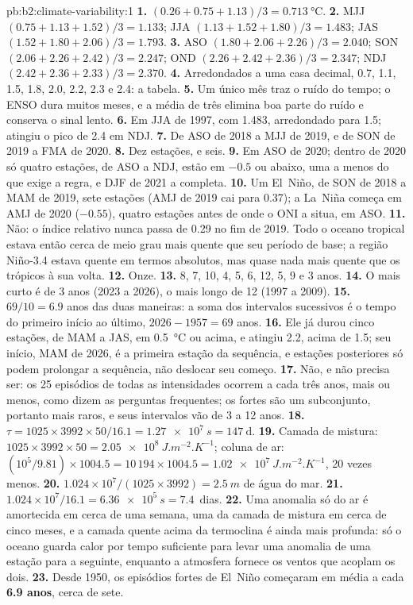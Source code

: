 \begin{solution}{pb:b2:climate-variability:1}
\textbf{1.} $(0.26 + 0.75 + 1.13)/3 = \qty{0.713}{\celsius}$.
\textbf{2.} MJJ $(0.75 + 1.13 + 1.52)/3 = 1.133$; JJA $(1.13 + 1.52 + 1.80)/3 = 1.483$; JAS $(1.52 +
1.80 + 2.06)/3 = 1.793$.
\textbf{3.} ASO $(1.80 + 2.06 + 2.26)/3 = 2.040$; SON $(2.06 + 2.26 + 2.42)/3 = 2.247$; OND $(2.26
+ 2.42 + 2.36)/3 = 2.347$; NDJ $(2.42 + 2.36 + 2.33)/3 = 2.370$.
\textbf{4.} Arredondados a uma casa decimal, 0.7, 1.1, 1.5, 1.8, 2.0, 2.2, 2.3 e 2.4: a tabela.
\textbf{5.} Um único mês traz o ruído do tempo; o ENSO dura muitos meses, e a média de três
elimina boa parte do ruído e conserva o sinal lento.
\textbf{6.} Em JJA de 1997, com 1.483, arredondado para 1.5; atingiu o pico de 2.4 em NDJ.
\textbf{7.} De ASO de 2018 a MJJ de 2019, e de SON de 2019 a FMA de 2020.
\textbf{8.} Dez estações, e seis.
\textbf{9.} Em ASO de 2020; dentro de 2020 só quatro estações, de ASO a NDJ, estão em $-0.5$ ou abaixo, uma
a menos do que exige a regra, e DJF de 2021 a completa.
\textbf{10.} Um El~Niño, de SON de 2018 a MAM de 2019, sete estações (AMJ de 2019 cai para 0.37); a
La~Niña começa em AMJ de 2020 ($-0.55$), quatro estações antes de onde o ONI a situa, em ASO.
\textbf{11.} Não: o índice relativo nunca passa de 0.29 no fim de 2019. Todo o oceano tropical estava
então cerca de meio grau mais quente que seu período de base; a região Niño-3.4 estava quente em
termos absolutos, mas quase nada mais quente que os trópicos à sua volta.
\textbf{12.} Onze.
\textbf{13.} 8, 7, 10, 4, 5, 6, 12, 5, 9 e 3 anos.
\textbf{14.} O mais curto é de 3 anos (2023 a 2026), o mais longo de 12 (1997 a 2009).
\textbf{15.} $69/10 = 6.9$ anos das duas maneiras: a soma dos intervalos sucessivos é o tempo do
primeiro início ao último, $2026 - 1957 = 69$ anos.
\textbf{16.} Ele já durou cinco estações, de MAM a JAS, em \qty{0.5}{\celsius} ou acima, e
atingiu 2.2, acima de 1.5; seu início, MAM de 2026, é a primeira estação da sequência, e estações posteriores
só podem prolongar a sequência, não deslocar seu começo.
\textbf{17.} Não, e não precisa ser: os 25 episódios de todas as intensidades ocorrem a cada três anos, mais ou menos, como dizem as perguntas frequentes;
os fortes são um subconjunto, portanto mais raros, e seus intervalos vão de 3 a 12 anos.
\textbf{18.} $\tau = 1025 \times 3992 \times 50/16.1 = \qty{1.27e7}{s} = \qty{147}{\day}$.
\textbf{19.} Camada de mistura: $1025 \times 3992 \times 50 = \qty{2.05e8}{J.m^{-2}.K^{-1}}$; coluna de ar:
$(10^5/9.81) \times 1004.5 = 10\,194 \times 1004.5 = \qty{1.02e7}{J.m^{-2}.K^{-1}}$, 20 vezes
menos.
\textbf{20.} $1.024 \times 10^7/(1025 \times 3992) = \qty{2.5}{m}$ de água do mar.
\textbf{21.} $1.024 \times 10^7/16.1 = \qty{6.36e5}{s} = 7.4$~dias.
\textbf{22.} Uma anomalia só do ar é amortecida em cerca de uma semana, uma da camada de mistura em
cerca de cinco meses, e a camada quente acima da termoclina é ainda mais profunda: só o oceano guarda
calor por tempo suficiente para levar uma anomalia de uma estação para a seguinte, enquanto a atmosfera fornece
os ventos que acoplam os dois.
\textbf{23.} Desde 1950, os episódios fortes de El~Niño começaram em média a cada \textbf{6.9 anos},
cerca de sete.
\end{solution}
